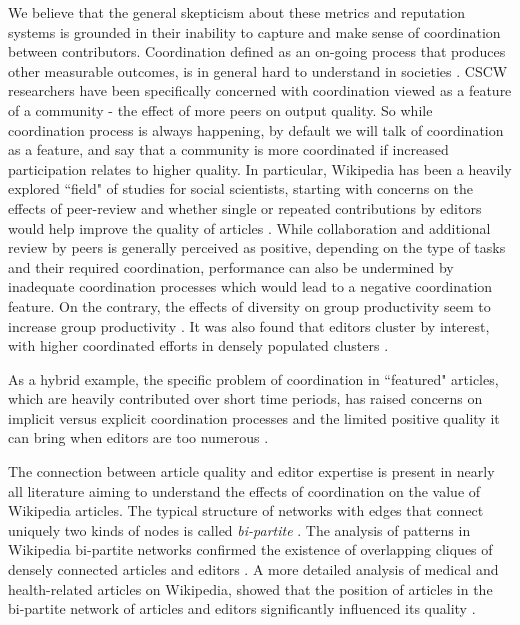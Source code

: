 We believe that the general skepticism about these metrics and reputation systems is grounded in their inability to capture and make sense of coordination between contributors. Coordination defined as an on-going process that produces other measurable outcomes, is in general hard to understand in societies \cite{ostrom1990}. CSCW researchers have been specifically concerned with coordination viewed as a feature of a community - the effect of more peers on output quality. So while coordination process is always happening, by default we will talk of coordination as a feature, and say that a community is more coordinated if increased participation relates to higher quality. In particular, Wikipedia has been a heavily explored ``field" of studies for social scientists, starting with concerns on the effects of peer-review and whether single or repeated contributions by editors would help improve the quality of articles \cite{hu2007articlequality,wilkinson2007}. While collaboration and additional review by peers is generally perceived as positive, depending on the type of tasks and their required coordination, performance can also be undermined by inadequate coordination processes \cite{kittur2009coordination} which would lead to a negative coordination feature. On the contrary, the effects of diversity on group productivity seem to increase group productivity \cite{chen2010}. It was also found that editors cluster by interest, with higher coordinated efforts in densely populated clusters \cite{jesus2009}. 

As a hybrid example, the specific problem of coordination in ``featured" articles, which are heavily contributed over short time periods, has raised concerns on implicit versus explicit coordination processes and the limited positive quality it can bring when editors are too numerous \cite{kittur2008}.
 
The connection between article quality and editor expertise is present in nearly all literature aiming to understand the effects of coordination on the value of Wikipedia articles. The typical structure of networks with edges that connect uniquely two kinds of nodes is called {\it bi-partite} \cite{newman2001}. The analysis of patterns in Wikipedia bi-partite networks confirmed the existence of overlapping cliques of densely connected articles and editors  \cite{jesus2009}. A more detailed analysis of medical and health-related articles on Wikipedia, showed that the position of articles in the bi-partite network of articles and editors significantly influenced its quality \cite{kane2009}. 


